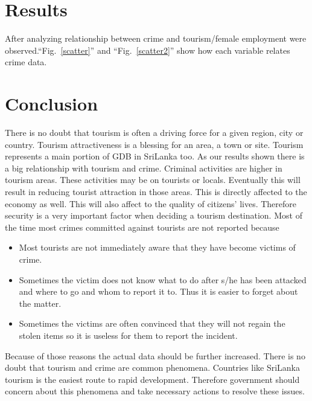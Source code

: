 \documentclass[conference]{IEEEtran}
\begin{document}
\section{Results}
After analyzing relationship between crime and tourism/female employment were observed.``Fig.~\ref{scatter}'' and ``Fig.~\ref{scatter2}'' show how each variable relates crime data.




\section{Conclusion}
There is no doubt that tourism is often a driving force for a given region, city or country. Tourism attractiveness is a blessing for an area, a town or site. Tourism represents a main portion of GDB in SriLanka too. As our results shown there is a big relationship with tourism and crime. Criminal activities are higher in tourism areas. These activities may be on tourists or locals. Eventually this will result in reducing tourist attraction in those areas. This is directly affected to the economy as well. This will also affect to the quality of citizens’ lives. Therefore security is a very important factor when deciding a tourism destination. Most of the time most crimes committed against tourists are not reported because
\begin{itemize}
    \item Most tourists are not immediately aware that they have become victims of crime.
    \item Sometimes the victim does not know what to do after s/he has been attacked and where to go and whom to report it to. Thus it is easier to forget about the matter.
    \item Sometimes the victims are often convinced that they will not regain the stolen items so it is useless for them to report the incident.
\end{itemize}
Because of those reasons the actual data should be further increased. There is no doubt that tourism and crime are common phenomena. Countries like SriLanka tourism is the easiest route to rapid development. Therefore government should concern about this phenomena and take necessary actions to resolve these issues.  
\end{document}
